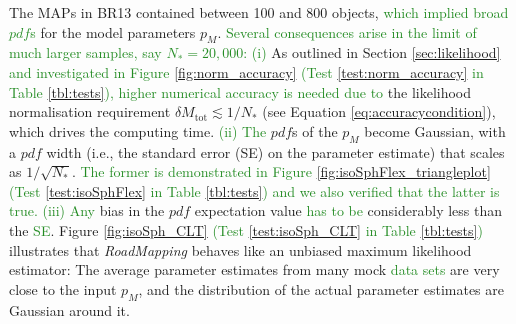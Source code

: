 \documentclass[iop,revtex4]{emulateapj}
\newcommand{\pdf}{\ensuremath{pdf}}
\newcommand{\pmodel}{\ensuremath{p_M}}
\newcommand{\MAP}{MAP}
\newcommand{\RM}{{\sl RoadMapping}}
\newcommand{\NEW}[1]{\textcolor{ForestGreen}{#1}}
\newcommand{\OLD}[1]{}
\begin{document}
The \OLD{individual }\MAP{}s in BR13 contained \OLD{typically }between 100 and 800 objects, \OLD{so that each \MAP{} implied  a quite broad \pdf{}}\NEW{which implied broad \pdf{}s} for the model parameters $\pmodel{}$. \OLD{Here we explore what happens in the limit of much larger samples, say $N_{*} = 20,000$ objects.}\NEW{Several consequences arise in the limit of much larger samples, say $N_{*} = 20,000$:} \NEW{(i)} As outlined in Section \ref{sec:likelihood} \NEW{and investigated in Figure \ref{fig:norm_accuracy} (Test \ref{test:norm_accuracy} in Table \ref{tbl:tests}),}\OLD{, the immediate consequence of larger samples is given by} \NEW{higher numerical accuracy is needed due to} the likelihood normalisation requirement $\delta M_\text{tot} \lesssim 1/N_{*}$ (see Equation \eqref{eq:accuracycondition}), which \OLD{is the modelling aspect that} drives the computing time. \NEW{(ii) The} \OLD{This issue aside, we would expect that in the limit of large data sets with vanishing measurement uncertainties the} \pdf{}s of the \pmodel{} become Gaussian, with a \pdf{} width (i.e., the standard error (SE) on the parameter estimate) that scales as $1/\sqrt{N_{*}}$. \NEW{The former is demonstrated in Figure \ref{fig:isoSphFlex_triangleplot} (Test \ref{test:isoSphFlex} in Table \ref{tbl:tests}) and we also verified that the latter is true.} \NEW{(iii) Any}\OLD{Further, we must verify that any} bias in the \pdf{} expectation value \OLD{is}\NEW{has to be} considerably less than the \NEW{SE}\OLD{error, even for quite large samples}. \OLD{Using sets of mock data, created according to the procedure in Section \ref{sec:mockdata} and a fiducial model for \pmodel{} (see Table \ref{tbl:tests}, Tests \ref{test:sqrtNiso}, \ref{test:isoSph_CLT}, and \ref{test:isoSphFlex}), we verified that \RM{} satisfies all these conditions and expectations: Figure \ref{fig:isoSphFlex_triangleplot} illustrates the joint \pdf{}s of all \pmodel{}. The \pdf{} is a multivariate Gaussian that projects into Gaussians when considering the marginalized \pdf{} for all the individual \pmodel{}. Figure \ref{fig:sqrtNiso} then demonstrates that the \pdf{} width indeed scales as $1/\sqrt{N_{*}}$.} Figure \ref{fig:isoSph_CLT} \NEW{(Test \ref{test:isoSph_CLT} in Table \ref{tbl:tests})} illustrates \OLD{even more }that \RM{} behaves like an unbiased maximum likelihood estimator: The average parameter estimates from many mock \OLD{samples with identical underlying \pmodel{}}\NEW{data sets} are very close to the input \pmodel{}, and the distribution of the actual parameter estimates are Gaussian around it.
\end{document}
